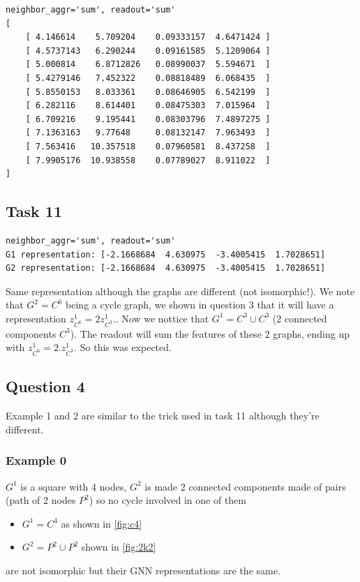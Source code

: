 \documentclass[a4paper]{article}
\begin{document}
\begin{verbatim}
neighbor_aggr='sum', readout='sum'
[
    [ 4.146614    5.709204    0.09333157  4.6471424 ]
    [ 4.5737143   6.290244    0.09161585  5.1209064 ]
    [ 5.000814    6.8712826   0.08990037  5.594671  ]
    [ 5.4279146   7.452322    0.08818489  6.068435  ]
    [ 5.8550153   8.033361    0.08646905  6.542199  ]
    [ 6.282116    8.614401    0.08475303  7.015964  ]
    [ 6.709216    9.195441    0.08303796  7.4897275 ]
    [ 7.1363163   9.77648     0.08132147  7.963493  ]
    [ 7.563416   10.357518    0.07960581  8.437258  ]
    [ 7.9905176  10.938558    0.07789027  8.911022  ]
]      
\end{verbatim}

\subsection*{Task 11}
\begin{verbatim}
neighbor_aggr='sum', readout='sum'
G1 representation: [-2.1668684  4.630975  -3.4005415  1.7028651]
G2 representation: [-2.1668684  4.630975  -3.4005415  1.7028651]
\end{verbatim}
Same representation although the graphs are different (not isomorphic!).
We note that $G^2 =C^6$ being a cycle graph, we shown in question 3 that it will have a representation $z^{1}_{C^6} = 2 z^{1}_{C^3}$..
Now we nottice that $G^{1} = C^3 \cup C^3$ (2 connected components $C^3$). The readout will sum the features of these 2 graphs,
ending up with $z^{1}_{C^6} = 2. z^{1}_{C^3}$.
So this was expected.

\break
\subsection*{Question 4}
Example 1 and 2 are similar to the trick used in task 11 although they're different.

\subsubsection*{Example 0}
$G^1$ is a square with 4 nodes, $G^2$ is made 2 connected components made of pairs (path of 2 nodes $P^2$) so no cycle involved in one of them 
\begin{itemize}
    \item $G^1 =C^4$ as shown in \ref{fig:c4}
    \item $G^2 =P^2 \cup P^2$ shown in \ref{fig:2k2}
\end{itemize} 
are not isomorphic but their GNN representations are the same.
\end{document}
